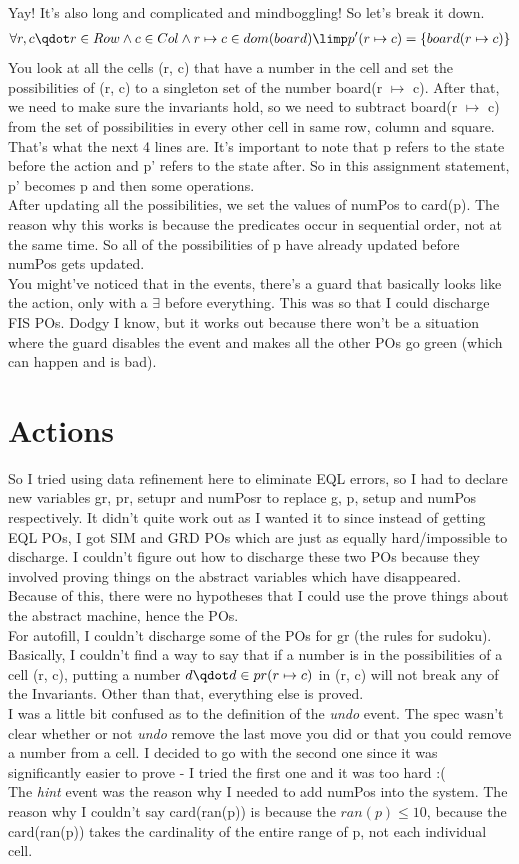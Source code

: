 \documentclass[a4paper]{article}
\begin{document}
Yay! It's also long and complicated and mindboggling! So let's break it down.
\begin{align*}
\forall  r, c \qdot  r \in  Row \land  c \in  Col \land  r \mapsto  c \in  dom(board) \limp  p'(r \mapsto  c) = \{ board(r \mapsto  c)\}
\end{align*}
You look at all the cells (r, c) that have a number in the cell and set the possibilities of (r, c) to a singleton set of the number board(r $\mapsto$ c). After that, we need to make sure the invariants hold, so we need to subtract board(r $\mapsto$ c) from the set of possibilities in every other cell in same row, column and square. That's what the next 4 lines are. It's important to note that p refers to the state before the action and p' refers to the state after. So in this assignment statement, p' becomes p and then some operations.\\
After updating all the possibilities, we set the values of numPos to card(p). The reason why this works is because the predicates occur in sequential order, not at the same time. So all of the possibilities of p have already updated before numPos gets updated.\\
You might've noticed that in the events, there's a guard that basically looks like the action, only with a  $\exists$ before everything. This was so that I could discharge FIS POs. Dodgy I know, but it works out because there won't be a situation where the guard disables the event and makes all the other POs go green (which can happen and is bad).

\section{Actions}
So I tried using data refinement here to eliminate EQL errors, so I had to declare new variables gr, pr, setupr and numPosr to replace g, p, setup and numPos respectively. It didn't quite work out as I wanted it to since instead of getting EQL POs, I got SIM and GRD POs which are just as equally hard/impossible to discharge. I couldn't figure out how to discharge these two POs because they involved proving things on the abstract variables which have disappeared. Because of this, there were no hypotheses that I could use the prove things about the abstract machine, hence the POs.\\
For autofill, I couldn't discharge some of the POs for gr (the rules for sudoku). Basically, I couldn't find a way to say that if a number is in the possibilities of a cell (r, c), putting a number $d \qdot d \in pr(r \mapsto c)$ in (r, c) will not break any of the Invariants. Other than that, everything else is proved.\\
I was a little bit confused as to the definition of the \textit{undo} event. The spec wasn't clear whether or not \textit{undo} remove the last move you did or that you could remove a number from a cell. I decided to go with the second one since it was significantly easier to prove - I tried the first one and it was too hard :(\\
The \textit{hint} event was the reason why I needed to add numPos into the system. The reason why I couldn't say card(ran(p)) is because the $ran(p) \le 10$, because the card(ran(p)) takes the cardinality of the entire range of p, not each individual cell.
\end{document}
